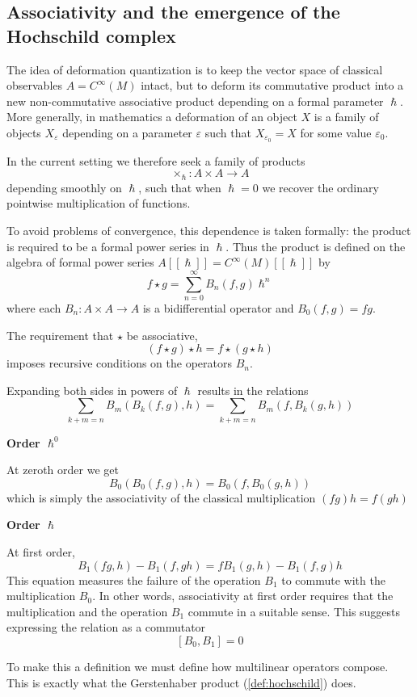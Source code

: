 \documentclass[
  12pt,
  a4paper, oneside
]{report}
\renewcommand{\hbar}{\hslash}
\theoremstyle{bolddef}
\theoremstyle{remark}
\numberwithin{equation}{chapter}
\begin{document}
\subsection*{Associativity and the emergence of the Hochschild complex}
The idea of deformation quantization is to keep the vector space of classical observables
$A = C^\infty(M)$ intact, but to deform its commutative product into a new
non-commutative associative product depending on a formal parameter $\hbar$.
More generally, in mathematics a deformation of an object $X$ is a family of
objects $X_\varepsilon$ depending on a parameter $\varepsilon$ such that
$X_{\varepsilon_0} = X$ for some value $\varepsilon_0$.

In the current setting we therefore seek a family of products
\[
\times_\hbar : A \times A \to A
\]
depending smoothly on $\hbar$, such that when $\hbar = 0$ we recover the
ordinary pointwise multiplication of functions.

To avoid problems of convergence, this dependence is taken formally: the
product is required to be a formal power series in $\hbar$. Thus the product
is defined on the algebra of formal power series
$A[[\hbar]] = C^\infty(M)[[\hbar]]$ by
\[
f \star g = \sum_{n=0}^{\infty} B_n(f,g)\hbar^n 
\]
where each
$B_n : A \times A \to A$
is a bidifferential operator and
$B_0(f,g) = fg$.

The requirement that $\star$ be associative,
\[
(f\star g)\star h=f\star(g\star h)
\]
imposes recursive conditions on the operators $B_n$.

Expanding both sides in powers of $\hbar$ results in the relations
\[
\sum_{k+m=n} B_m(B_k(f,g),h)
=
\sum_{k+m=n} B_m(f,B_k(g,h))
\]


\textbf{Order $\symbf{\hbar}^0$}

At zeroth order we get
\[
B_0(B_0(f,g),h)=B_0(f,B_0(g,h))
\]
which is simply the associativity of the classical multiplication
$(fg)h=f(gh)$


\textbf{Order $\symbf{\hbar}$}

At first order,
\[
B_1(fg,h)-B_1(f,gh)
=
fB_1(g,h)-B_1(f,g)h
\]
This equation measures the failure of the operation $B_1$ to commute with
the multiplication $B_0$. In other words, associativity at first order
requires that the multiplication and the operation $B_1$ commute in a suitable sense.
This suggests expressing the relation as a commutator
\[
[B_0,B_1]=0
\]

To make this a definition we must define how multilinear operators compose. This is exactly what the Gerstenhaber product (\ref{def:hochschild}) does.
\end{document}
